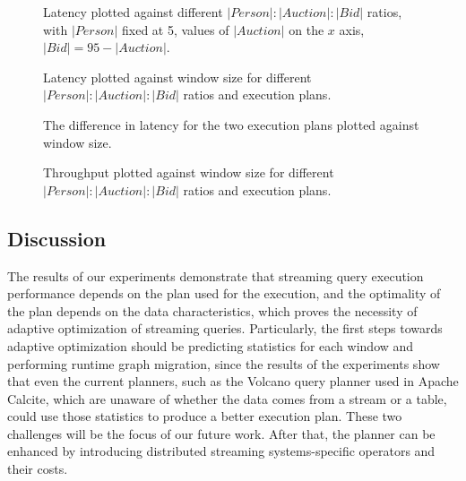 \begin{figure}
\centering

\caption{Latency plotted against different $|Person|:|Auction|:|Bid|$ ratios, with $|Person|$ fixed at 5, values of $|Auction|$ on the $x$ axis, $|Bid| = 95 - |Auction|$.} 
\label{fig:latency_ratio}
\end{figure}


\begin{figure}
\centering

\caption{Latency plotted against window size for different $|Person|:|Auction|:|Bid|$ ratios and execution plans.}
\label{fig:latency_against_window_size}
\end{figure}


\begin{figure}
\centering

\caption{The difference in latency for the two execution plans plotted against window size.}

\label{fig:latency_diff_against_window_size}
\end{figure}

\begin{figure}
\centering

\caption{Throughput plotted against window size for different $|Person|:|Auction|:|Bid|$ ratios and execution plans.}
\label{fig:throughput_against_window_size}
\end{figure}


\subsection{Discussion}

The results of our experiments demonstrate that streaming query execution performance depends on the plan used for the execution, and the optimality of the plan depends on the data characteristics, which proves the necessity of adaptive optimization of streaming queries. Particularly, the first steps towards adaptive optimization should be predicting statistics for each window and performing runtime graph migration, since the results of the experiments show that even the current planners, such as the Volcano query planner \cite{graefe1993volcano} used in Apache Calcite, which are unaware of whether the data comes from a stream or a table, could use those statistics to produce a better execution plan. These two challenges will be the focus of our future work. After that, the planner can be enhanced by introducing distributed streaming systems-specific operators and their costs.



